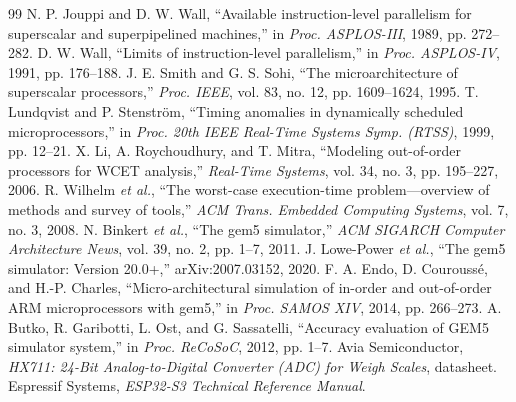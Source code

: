 \documentclass[12pt, a4paper]{article}
\begin{document}
\begin{thebibliography}{99}
 N. P. Jouppi and D. W. Wall, ``Available instruction-level parallelism for superscalar and superpipelined machines,'' in \textit{Proc. ASPLOS-III}, 1989, pp. 272--282.
 D. W. Wall, ``Limits of instruction-level parallelism,'' in \textit{Proc. ASPLOS-IV}, 1991, pp. 176--188.
 J. E. Smith and G. S. Sohi, ``The microarchitecture of superscalar processors,'' \textit{Proc. IEEE}, vol. 83, no. 12, pp. 1609--1624, 1995.
 T. Lundqvist and P. Stenström, ``Timing anomalies in dynamically scheduled microprocessors,'' in \textit{Proc. 20th IEEE Real-Time Systems Symp. (RTSS)}, 1999, pp. 12--21.
 X. Li, A. Roychoudhury, and T. Mitra, ``Modeling out-of-order processors for WCET analysis,'' \textit{Real-Time Systems}, vol. 34, no. 3, pp. 195--227, 2006.
 R. Wilhelm \textit{et al.}, ``The worst-case execution-time problem---overview of methods and survey of tools,'' \textit{ACM Trans. Embedded Computing Systems}, vol. 7, no. 3, 2008.
 N. Binkert \textit{et al.}, ``The gem5 simulator,'' \textit{ACM SIGARCH Computer Architecture News}, vol. 39, no. 2, pp. 1--7, 2011.
 J. Lowe-Power \textit{et al.}, ``The gem5 simulator: Version 20.0+,'' arXiv:2007.03152, 2020.
 F. A. Endo, D. Couroussé, and H.-P. Charles, ``Micro-architectural simulation of in-order and out-of-order ARM microprocessors with gem5,'' in \textit{Proc. SAMOS XIV}, 2014, pp. 266--273.
 A. Butko, R. Garibotti, L. Ost, and G. Sassatelli, ``Accuracy evaluation of GEM5 simulator system,'' in \textit{Proc. ReCoSoC}, 2012, pp. 1--7.
 Avia Semiconductor, \textit{HX711: 24-Bit Analog-to-Digital Converter (ADC) for Weigh Scales}, datasheet.
 Espressif Systems, \textit{ESP32-S3 Technical Reference Manual}.
\end{thebibliography}
\end{document}
